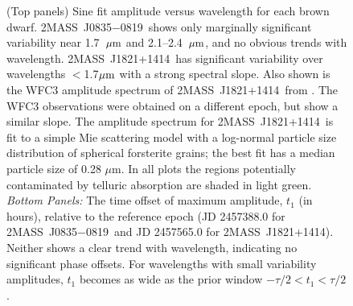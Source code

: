 \documentclass[twocolumn]{aastex6}
\newcommand{\sha}{2MASS~J0835$-$0819}
\newcommand{\shb}{2MASS~J1821+1414}
\begin{document}
\begin{figure}
\centering
{}
	\caption{(Top panels) Sine fit amplitude versus wavelength for each brown dwarf. \sha\ shows only marginally significant variability near 1.7~$\mbox{$\mu$m}$ and 2.1--2.4~$\mbox{$\mu$m}$, and no obvious trends with wavelength. \shb\ has significant variability over wavelengths $<$1.7$\mbox{$\mu$m}$ with a strong spectral slope.
	 Also shown is the WFC3 amplitude spectrum of \shb\ from \citet{2015ApJ...798L..13Y}. The WFC3 observations were obtained on a different epoch, but show a similar slope.
	 The amplitude spectrum for \shb\ is fit to a simple Mie scattering model with a log-normal particle size distribution of spherical forsterite grains; the best fit has a median particle size of 0.28 $\mu$m.
	 In all plots the regions potentially contaminated by telluric absorption are shaded in light green.
	 {\it Bottom Panels:} The time offset of maximum amplitude, $t_1$ (in hours), relative to the reference epoch (JD 2457388.0 for \sha\ and JD 2457565.0 for {\shb}).
	 Neither shows a clear trend with wavelength, indicating no significant phase offsets.
	 For wavelengths with small variability amplitudes, $t_1$ becomes as wide as the prior window $-\tau/2 < t_1 < \tau/2$.}
	\label{fig:ampSpec}
\end{figure} 
\end{document}
